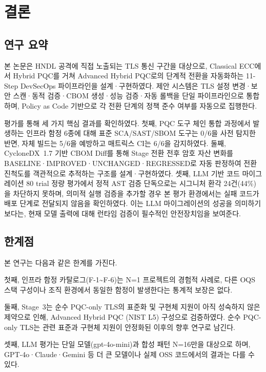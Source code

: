 \section{결론}

\subsection{연구 요약}

본 논문은 HNDL 공격에 직접 노출되는 TLS 통신 구간을 대상으로, Classical ECC에서 Hybrid PQC를 거쳐 Advanced Hybrid PQC로의 단계적 전환을 자동화하는 11-Step DevSecOps 파이프라인을 설계·구현하였다.
제안 시스템은 TLS 설정 변경·보안 스캔·동적 검증·CBOM 생성·성능 검증·자동 롤백을 단일 파이프라인으로 통합하며, Policy as Code 기반으로 각 전환 단계의 정책 준수 여부를 자동으로 집행한다.

평가를 통해 세 가지 핵심 결과를 확인하였다.
첫째, PQC 도구 체인 통합 과정에서 발생하는 인프라 함정 6종에 대해 표준 SCA/SAST/SBOM 도구는 0/6을 사전 탐지한 반면, 자체 빌드는 5/6을 예방하고 매트릭스 CI는 6/6을 감지하였다.
둘째, CycloneDX~1.7 기반 CBOM Diff를 통해 Stage 전환 전후 암호 자산 변화를 BASELINE·IMPROVED·UNCHANGED·REGRESSED로 자동 판정하여 전환 진척도를 객관적으로 추적하는 구조를 설계·구현하였다.
셋째, LLM 기반 코드 마이그레이션 80 trial 정량 평가에서 정적 AST 검증 단독으로는 시그니처 환각 24건(44\%)을 차단하지 못하며, 의미적 실행 검증을 추가할 경우 본 평가 환경에서는 실패 코드가 배포 단계로 전달되지 않음을 확인하였다.
이는 LLM 마이그레이션의 성공을 의미하기보다는, 현재 모델 출력에 대해 런타임 검증이 필수적인 안전장치임을 보여준다.

\subsection{한계점}

본 연구는 다음과 같은 한계를 가진다.

첫째, 인프라 함정 카탈로그(F-1\textasciitilde F-6)는 N=1 프로젝트의 경험적 사례로, 다른 OQS 스택 구성이나 조직 환경에서 동일한 함정이 발생한다는 통계적 보장은 없다.

둘째, Stage~3는 순수 PQC-only TLS의 표준화 및 구현체 지원이 아직 성숙하지 않은 제약으로 인해, Advanced Hybrid PQC (NIST L5) 구성으로 검증하였다.
순수 PQC-only TLS는 관련 표준과 구현체 지원이 안정화된 이후의 향후 연구로 남긴다.

셋째, LLM 평가는 단일 모델(gpt-4o-mini)과 합성 패턴 N=16만을 대상으로 하며, GPT-4o·Claude·Gemini 등 더 큰 모델이나 실제 OSS 코드에서의 결과는 다를 수 있다.

